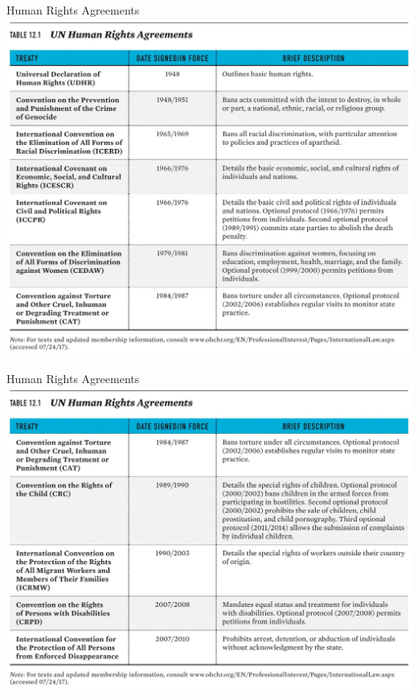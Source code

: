 \documentclass[handout]{beamer}
\begin{document}
\begin{frame}{\LARGE Human Rights Agreements}
	\centering
	\includegraphics[width=\textwidth,height=0.9\textheight,keepaspectratio]{UNHR1.jpg}
\end{frame}

\begin{frame}{\LARGE Human Rights Agreements}
	\centering
	\includegraphics[width=\textwidth,height=0.9\textheight,keepaspectratio]{UNHR2.jpg}
\end{frame}
\end{document}
